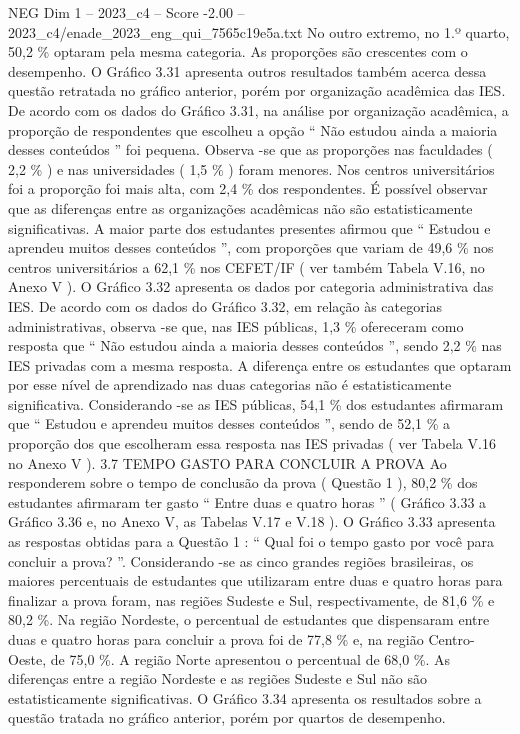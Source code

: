 \begin{textsample}{NEG Dim 1 – 2023\_c4 – Score -2.00 – 2023\_c4/enade\_2023\_eng\_qui\_7565c19e5a.txt}
No outro extremo, no 1.º quarto, 50,2 \% optaram pela mesma categoria.
As proporções são crescentes com o desempenho.
O Gráfico 3.31 apresenta outros resultados também acerca dessa questão retratada no gráfico anterior, porém por organização acadêmica das IES.
De acordo com os dados do Gráfico 3.31, na análise por organização acadêmica, a proporção de respondentes que escolheu a opção “ Não estudou ainda a maioria desses conteúdos ” foi pequena.
Observa -se que as proporções nas faculdades ( 2,2 \% ) e nas universidades ( 1,5 \% ) foram menores.
Nos centros universitários foi a proporção foi mais alta, com 2,4 \% dos respondentes.
É possível observar que as diferenças entre as organizações acadêmicas não são estatisticamente significativas.
A maior parte dos estudantes presentes afirmou que “ Estudou e aprendeu muitos desses conteúdos ”, com proporções que variam de 49,6 \% nos centros universitários a 62,1 \% nos CEFET/IF ( ver também Tabela V.16, no Anexo V ).
O Gráfico 3.32 apresenta os dados por categoria administrativa das IES.
De acordo com os dados do Gráfico 3.32, em relação às categorias administrativas, observa -se que, nas IES públicas, 1,3 \% ofereceram como resposta que “ Não estudou ainda a maioria desses conteúdos ”, sendo 2,2 \% nas IES privadas com a mesma resposta.
A diferença entre os estudantes que optaram por esse nível de aprendizado nas duas categorias não é estatisticamente significativa.
Considerando -se as IES públicas, 54,1 \% dos estudantes afirmaram que “ Estudou e aprendeu muitos desses conteúdos ”, sendo de 52,1 \% a proporção dos que escolheram essa resposta nas IES privadas ( ver Tabela V.16 no Anexo V ). 3.7 TEMPO GASTO PARA CONCLUIR A PROVA Ao responderem sobre o tempo de conclusão da prova ( Questão 1 ), 80,2 \% dos estudantes afirmaram ter gasto “ Entre duas e quatro horas ” ( Gráfico 3.33 a Gráfico 3.36 e, no Anexo V, as Tabelas V.17 e V.18 ).
O Gráfico 3.33 apresenta as respostas obtidas para a Questão 1 : “ Qual foi o tempo gasto por você para concluir a prova? ”.
Considerando -se as cinco grandes regiões brasileiras, os maiores percentuais de estudantes que utilizaram entre duas e quatro horas para finalizar a prova foram, nas regiões Sudeste e Sul, respectivamente, de 81,6 \% e 80,2 \%.
Na região Nordeste, o percentual de estudantes que dispensaram entre duas e quatro horas para concluir a prova foi de 77,8 \% e, na região Centro-Oeste, de 75,0 \%.
A região Norte apresentou o percentual de 68,0 \%.
As diferenças entre a região Nordeste e as regiões Sudeste e Sul não são estatisticamente significativas.
O Gráfico 3.34 apresenta os resultados sobre a questão tratada no gráfico anterior, porém por quartos de desempenho.

\end{textsample}
